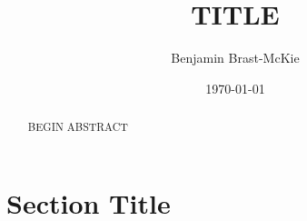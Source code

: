 \documentclass[11pt]{article} %
\begin{document}
\title{TITLE}
\author{Benjamin Brast-McKie}
\date{\today}
\maketitle
\thispagestyle{empty}

\begin{abstract}
\noindent BEGIN ABSTRACT
\end{abstract}

\doublespacing




\section{Section Title}














\newpage
\begin{small} %
\singlespacing %
\thispagestyle{empty} %
\end{small} %
\end{document}

